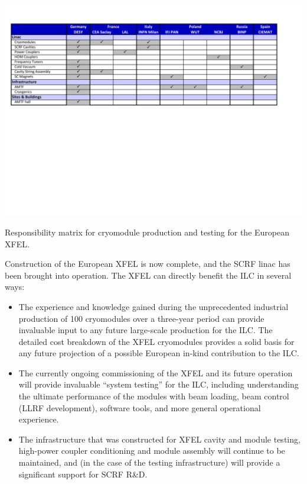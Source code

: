 \documentclass[%
 reprint,
 amsmath,amssymb,
 aps,
]{revtex4-1}
\begin{document}
\begin{table}[t]
\includegraphics[width=\textwidth]{figures/ILCEAP-Matrices-XFEL.pdf}
\caption{\label{tab:PrePrep:XFELResponsibilities} Responsibility matrix for cryomodule production and testing for the European XFEL.} 
\end{table}

Construction of the European XFEL is now complete, and the SCRF linac has been brought into operation. The XFEL can directly benefit the ILC in several ways: \\
\begin{itemize}
\item The experience and knowledge gained during the unprecedented industrial
production of 100 cryomodules over a three-year period can provide 
invaluable input to any future large-scale production for the ILC. The detailed cost breakdown of the XFEL cryomodules provides a solid basis for any future projection of a possible European in-kind contribution to the ILC. 
\item 
The currently ongoing commissioning of the XFEL and its future operation will provide invaluable ``system testing'' for the ILC, including understanding the ultimate performance of the modules with beam loading, beam control (LLRF development), software tools, and more general operational experience. 
\item The infrastructure that was constructed for XFEL cavity and module 
testing, high-power coupler conditioning and module assembly will continue to be maintained, and (in the case of the testing infrastructure) will provide a significant support for SCRF R\&D.
\end{itemize}
\end{document}
